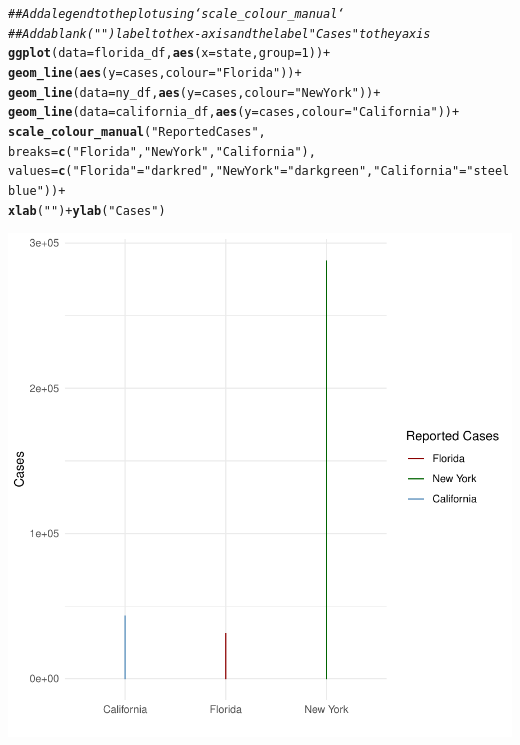 \documentclass{article}\usepackage[]{graphicx}\usepackage[]{xcolor}
\makeatletter
\newcommand{\hlnum}[1]{\textcolor[rgb]{0.686,0.059,0.569}{#1}}%
\newcommand{\hlstr}[1]{\textcolor[rgb]{0.192,0.494,0.8}{#1}}%
\newcommand{\hlcom}[1]{\textcolor[rgb]{0.678,0.584,0.686}{\textit{#1}}}%
\newcommand{\hlopt}[1]{\textcolor[rgb]{0,0,0}{#1}}%
\newcommand{\hlstd}[1]{\textcolor[rgb]{0.345,0.345,0.345}{#1}}%
\newcommand{\hlkwc}[1]{\textcolor[rgb]{0.333,0.667,0.333}{#1}}%
\newcommand{\hlkwd}[1]{\textcolor[rgb]{0.737,0.353,0.396}{\textbf{#1}}}%
\newenvironment{kframe}{%
 \def\at@end@of@kframe{}%
 \ifinner\ifhmode%
  \def\at@end@of@kframe{\end{minipage}}%
  \begin{minipage}{\columnwidth}%
 \fi\fi%
 \def\FrameCommand##1{\hskip\@totalleftmargin \hskip-\fboxsep
 \colorbox{shadecolor}{##1}\hskip-\fboxsep
     \hskip-\linewidth \hskip-\@totalleftmargin \hskip\columnwidth}%
 \MakeFramed {\advance\hsize-\width
   \@totalleftmargin\z@ \linewidth\hsize
   \@setminipage}}%
 {\par\unskip\endMakeFramed%
 \at@end@of@kframe}
\newenvironment{knitrout}{}{} %
\makeatother
\begin{document}
\begin{knitrout}
{}


\begin{kframe}\begin{alltt}
\hlcom{## Add a legend to the plot using `scale_colour_manual`}
\hlcom{## Add a blank (" ") label to the x-axis and the label "Cases" to the y axis}
\hlkwd{ggplot}\hlstd{(}\hlkwc{data}\hlstd{=florida_df,} \hlkwd{aes}\hlstd{(}\hlkwc{x}\hlstd{=state,} \hlkwc{group}\hlstd{=}\hlnum{1}\hlstd{))} \hlopt{+}
  \hlkwd{geom_line}\hlstd{(}\hlkwd{aes}\hlstd{(}\hlkwc{y} \hlstd{= cases,} \hlkwc{colour} \hlstd{=} \hlstr{"Florida"}\hlstd{))} \hlopt{+}
  \hlkwd{geom_line}\hlstd{(}\hlkwc{data}\hlstd{=ny_df,} \hlkwd{aes}\hlstd{(}\hlkwc{y} \hlstd{= cases,} \hlkwc{colour} \hlstd{=} \hlstr{"New York"}\hlstd{))} \hlopt{+}
  \hlkwd{geom_line}\hlstd{(}\hlkwc{data}\hlstd{=california_df,} \hlkwd{aes}\hlstd{(}\hlkwc{y} \hlstd{= cases,} \hlkwc{colour} \hlstd{=} \hlstr{"California"}\hlstd{))} \hlopt{+}
  \hlkwd{scale_colour_manual}\hlstd{(}\hlstr{"Reported Cases"}\hlstd{,}
                      \hlkwc{breaks} \hlstd{=} \hlkwd{c}\hlstd{(}\hlstr{"Florida"}\hlstd{,} \hlstr{"New York"}\hlstd{,} \hlstr{"California"}\hlstd{),}
                      \hlkwc{values} \hlstd{=} \hlkwd{c}\hlstd{(}\hlstr{"Florida"} \hlstd{=} \hlstr{"darkred"}\hlstd{,} \hlstr{"New York"} \hlstd{=} \hlstr{"darkgreen"}\hlstd{,} \hlstr{"California"} \hlstd{=} \hlstr{"steelblue"}\hlstd{))} \hlopt{+}
    \hlkwd{xlab}\hlstd{(}\hlstr{" "}\hlstd{)} \hlopt{+} \hlkwd{ylab}\hlstd{(}\hlstr{"Cases"}\hlstd{)}
\end{alltt}
\end{kframe}

{\centering \includegraphics[width=.6\linewidth]{figure/assignment-04-Quintero-Vasquez-Johnatan-Rnwauto-report-9} 

}



\end{knitrout}
\end{document}

